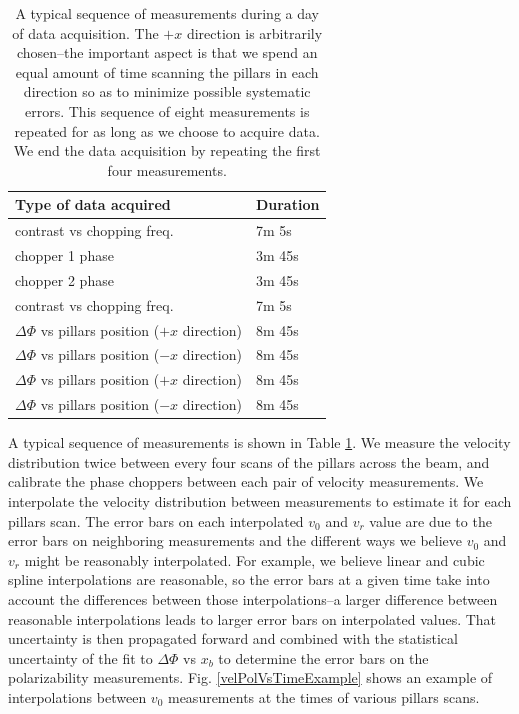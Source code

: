 \documentclass[twocolumn,prl,showpacs,superscriptaddress]{revtex4-1}   %
\newcommand{\figref}[1]{Fig. \ref{#1}}
\begin{document}
\begingroup
\begin{table}
\caption{\label{schedule}A typical sequence of measurements during a day of data acquisition. The $+x$ direction is arbitrarily chosen--the important aspect is that we spend an equal amount of time scanning the pillars in each direction so as to minimize possible systematic errors. This sequence of eight measurements is repeated for as long as we choose to acquire data. We end the data acquisition by repeating the first four measurements.}
\begin{center}
\begin{tabular}{l l}
\hline
\hline
Type of data acquired & Duration \\
\hline
contrast vs chopping freq. & 7m 5s \\
chopper 1 phase & 3m 45s \\
chopper 2 phase & 3m 45s\\
contrast vs chopping freq. & 7m 5s \\
$\Delta\Phi$ vs pillars position ($+x$ direction) & 8m 45s \\
$\Delta\Phi$ vs pillars position ($-x$ direction) & 8m 45s \\
$\Delta\Phi$ vs pillars position ($+x$ direction) & 8m 45s \\
$\Delta\Phi$ vs pillars position ($-x$ direction) & 8m 45s \\
\hline
\hline
\end{tabular}
\end{center}
\end{table}
\endgroup

A typical sequence of measurements is shown in Table \ref{schedule}.
We measure the velocity distribution twice between every four scans of the pillars across the beam, and calibrate the phase choppers between each pair of velocity measurements.
We interpolate the velocity distribution between measurements to estimate it for each pillars scan. The error bars on each interpolated $v_0$ and $v_r$ value are due to the error bars on neighboring measurements and the different ways we believe $v_0$ and $v_r$ might be reasonably interpolated. For example, we believe linear and cubic spline interpolations are reasonable, so the error bars at a given time take into account the differences between those interpolations--a larger difference between reasonable interpolations leads to larger error bars on interpolated values. That uncertainty is then propagated forward and combined with the statistical uncertainty of the fit to $\Delta\Phi$ vs $x_b$ to determine the error bars on the polarizability measurements. \figref{velPolVsTimeExample} shows an example of interpolations between $v_0$ measurements at the times of various pillars scans.
\end{document}
